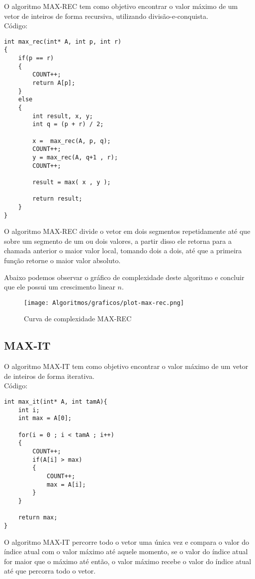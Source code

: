 \documentclass[a4paper, 12pt]{article}
\begin{document}
O algoritmo MAX-REC tem como objetivo encontrar o valor máximo de um vetor de inteiros de forma recursiva, utilizando divisão-e-conquista.\\


Código:

\begin{lstlisting}
int max_rec(int* A, int p, int r)
{
	if(p == r)
	{
		COUNT++;
		return A[p];
	}
	else
	{
		int result, x, y;
		int q = (p + r) / 2;
		
		x =  max_rec(A, p, q);
		COUNT++;
		y = max_rec(A, q+1 , r);
		COUNT++;
		
		result = max( x , y );
			
		return result;		
	}
}
\end{lstlisting}

O algoritmo MAX-REC divide o vetor em dois segmentos repetidamente até que sobre um segmento de um ou dois valores, a partir disso ele retorna para a chamada anterior o maior valor local, tomando dois a dois, até que a primeira função retorne o maior valor absoluto. 

Abaixo podemos observar o gráfico de complexidade deste algoritmo e concluir que ele possui um crescimento linear $n$.

\begin{figure}[h]
	\centering
	\texttt{[image: Algoritmos/graficos/plot-max-rec.png]}
	\caption{Curva de complexidade MAX-REC}
	\label{fig:max-rec}
\end{figure}

\newpage
\subsection{MAX-IT}

O algoritmo MAX-IT tem como objetivo encontrar o valor máximo de um vetor de inteiros de forma iterativa.\\


Código:

\begin{lstlisting}
int max_it(int* A, int tamA){
	int i;
	int max = A[0];

	for(i = 0 ; i < tamA ; i++)
	{
		COUNT++;
		if(A[i] > max)
		{
			COUNT++;
			max = A[i];
		}
	}

	return max;	
}
\end{lstlisting}

O algoritmo MAX-IT percorre todo o vetor uma única vez e compara o valor do índice atual com o valor máximo até aquele momento, se o valor do índice atual for maior que o máximo até então, o valor máximo recebe o valor do índice atual até que percorra todo o vetor.
\end{document}
